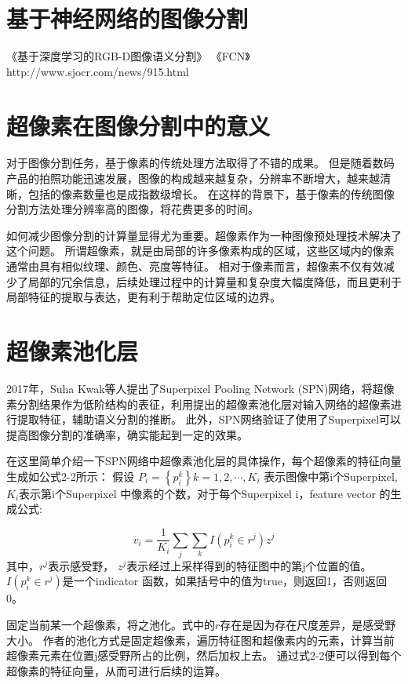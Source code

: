 \section{基于神经网络的图像分割}
《基于深度学习的RGB-D图像语义分割》
《FCN》http://www.sjocr.com/news/915.html
\section{超像素在图像分割中的意义}
对于图像分割任务，基于像素的传统处理方法取得了不错的成果。
但是随着数码产品的拍照功能迅速发展，图像的构成越来越复杂，分辨率不断增大，越来越清晰，包括的像素数量也是成指数级增长。
在这样的背景下，基于像素的传统图像分割方法处理分辨率高的图像，将花费更多的时间。

如何减少图像分割的计算量显得尤为重要。超像素作为一种图像预处理技术解决了这个问题。
所谓超像素，就是由局部的许多像素构成的区域，这些区域内的像素通常由具有相似纹理、颜色、亮度等特征。
相对于像素而言，超像素不仅有效减少了局部的冗余信息，后续处理过程中的计算量和复杂度大幅度降低，而且更利于局部特征的提取与表达，更有利于帮助定位区域的边界。

\section{超像素池化层}

2017年，Suha Kwak等人提出了Superpixel Pooling Network (SPN)网络，将超像素分割结果作为低阶结构的表征，利用提出的超像素池化层对输入网络的超像素进行提取特征，辅助语义分割的推断。
此外，SPN网络验证了使用了Superpixel可以提高图像分割的准确率，确实能起到一定的效果。

在这里简单介绍一下SPN网络中超像素池化层的具体操作，每个超像素的特征向量生成如公式2-2所示：
假设 $P_{i}= \left \{ p_{i}^{k} \right \} k=1,2,\cdots ,K_i$ 表示图像中第i个Superpixel,$K_i$表示第i个Superpixel 中像素的个数，对于每个Superpixel i，feature vector 的生成公式:

\begin{equation}
v_{i} = \frac{1}{K_i}\sum_{j}\sum_{k}I(p_{i}^{k}\in r^{j})z^{j}
\end{equation}
其中，$r^{j}$表示感受野， $z^{j}$表示经过上采样得到的特征图中的第j个位置的值。 $I(p_{i}^{k}\in r^{j})$是一个indicator 函数，如果括号中的值为true，则返回1，否则返回0。

固定当前某一个超像素，将之池化。式中的$r$存在是因为存在尺度差异，是感受野大小。
作者的池化方式是固定超像素，遍历特征图和超像素内的元素，计算当前超像素元素在位置j感受野所占的比例，然后加权上去。
通过式2-2便可以得到每个超像素的特征向量，从而可进行后续的运算。
